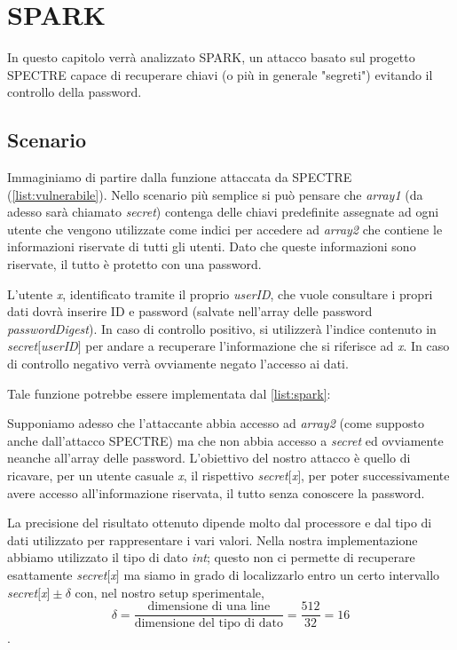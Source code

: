 \chapter{SPARK}
	In questo capitolo verrà analizzato \ac{SPARK}, un attacco basato sul progetto SPECTRE capace di recuperare chiavi (o più in generale "segreti") evitando il controllo della password.
	
	\section{Scenario}
		Immaginiamo di partire dalla funzione attaccata da SPECTRE (\cref{list:vulnerabile}). Nello scenario più semplice si può pensare che \emph{array1} (da adesso sarà chiamato \emph{secret}) contenga delle chiavi predefinite assegnate ad ogni utente che vengono utilizzate come indici  per accedere ad \emph{array2} che contiene le informazioni riservate di tutti gli utenti. Dato che queste informazioni sono riservate, il tutto è protetto con una password. 
		
		L'utente \emph{x}, identificato tramite il proprio \emph{userID}, che vuole consultare i propri dati dovrà inserire ID e password (salvate nell'array delle password \emph{passwordDigest}). In caso di controllo positivo, si utilizzerà l'indice contenuto in \emph{secret}$[$\emph{userID}$]$ per andare a recuperare l'informazione che si riferisce ad \emph{x}. In caso di controllo negativo verrà ovviamente negato l'accesso ai dati.
		
		Tale funzione potrebbe essere implementata dal \cref{list:spark}:
		
		Supponiamo adesso che l'attaccante abbia accesso ad \emph{array2} (come supposto anche dall'attacco SPECTRE) ma che non abbia accesso a \emph{secret} ed ovviamente neanche all'array delle password. L'obiettivo del nostro attacco è quello di ricavare, per un utente casuale \emph{x}, il rispettivo \emph{secret}$[$\emph{x}$]$, per poter successivamente avere accesso all'informazione riservata, il tutto senza conoscere la password.
		
		La precisione del risultato ottenuto dipende molto dal processore e dal tipo di dati utilizzato per rappresentare i vari valori. Nella nostra implementazione abbiamo utilizzato il tipo di dato \emph{int}; questo non ci permette di recuperare esattamente \emph{secret}$[$\emph{x}$]$ ma siamo in grado di localizzarlo entro un certo intervallo \emph{secret}$[$\emph{x}$] \pm \delta$ con, nel nostro setup sperimentale, $$\delta = \frac{\text{dimensione di una line}}{\text{dimensione del tipo di dato}} = \frac{512}{32} = 16$$.
		
